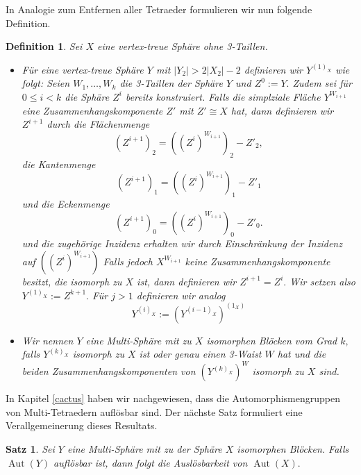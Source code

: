 \documentclass[12pt,titlepage,twoside,cleardoublepage]{article}
\theoremstyle{nummermitklammern}
\newtheorem{definition}[temp]{Definition}
\newtheorem{satz}[temp]{Satz}
\newtheorem{definition}[zahl]{Definition}
\newtheorem{satz}[zahl]{Satz}
\numberwithin{equation}{section}
\DeclareMathOperator{\Aut}{Aut}
\begin{document}
In Analogie zum Entfernen aller Tetraeder formulieren wir nun folgende Definition.
\begin{definition}
Sei $X$ eine vertex-treue Sphäre ohne 3-Taillen.
\begin{itemize}
\item Für eine vertex-treue Sphäre $Y$ mit $\vert Y_2 \vert > 2\vert X_2 \vert-2$ definieren wir $Y^{(1)_X}$ wie folgt:
Seien $W_1,\ldots,W_k$ die 3-Taillen der Sphäre $Y$ und $Z^0:=Y.$ 
Zudem sei für $0\leq i < k$ die Sphäre $Z^i$ bereits konstruiert.
Falls die simplziale Fläche $Y^{W_{i+1}}$ eine Zusammenhangskomponente $Z'$ mit $Z'\cong X$ hat, dann definieren wir $Z^{i+1}$ durch die Flächenmenge 
\[
(Z^{i+1})_2=((Z^{i})^{W_{i+1}})_2-Z'_2,
\]
die Kantenmenge
\[
(Z^{i+1})_1=((Z^{i})^{W_{i+1}})_1-Z'_1
\]
und die Eckenmenge 
\[
(Z^{i+1})_0=((Z^{i})^{W_{i+1}})_0-Z'_0.
\]
und die zugehörige Inzidenz erhalten wir durch Einschränkung der Inzidenz auf $((Z^{i})^{W_{i+1}})$
Falls jedoch $X^{W_{i+1}}$ keine Zusammenhangskomponente besitzt, die isomorph zu $X$ ist, dann definieren wir $Z^{i+1}=Z^i.$ Wir setzen also $Y^{(1)_X}:=Z^{k+1}.$ 
Für $j>1$ definieren wir analog 
\[
Y^{(i)_X}:={(Y^{(i-1)_X})}^{(1_X)}
\]
\item Wir nennen $Y$ eine Multi-Sphäre mit zu $X$ isomorphen Blöcken vom Grad $k,$ falls $Y^{(k)_X}$ isomorph zu $X$ ist oder genau einen 3-Waist $W$ hat und die beiden Zusammenhangskomponenten von $(Y^{(k)_X})^W$ isomorph zu $X$ sind.
\end{itemize}
\end{definition}
In Kapitel \ref{cactus} haben wir nachgewiesen, dass die Automorphismengruppen von Multi-Tetraedern auflösbar sind. Der nächste Satz formuliert eine Verallgemeinerung dieses Resultats. 
\begin{satz}
Sei $Y$ eine Multi-Sphäre mit zu der Sphäre $X$ isomorphen Blöcken. Falls $\Aut(Y)$ auflösbar ist, dann folgt die Auslösbarkeit von $\Aut(X).$ 
\end{satz}
\end{document}
